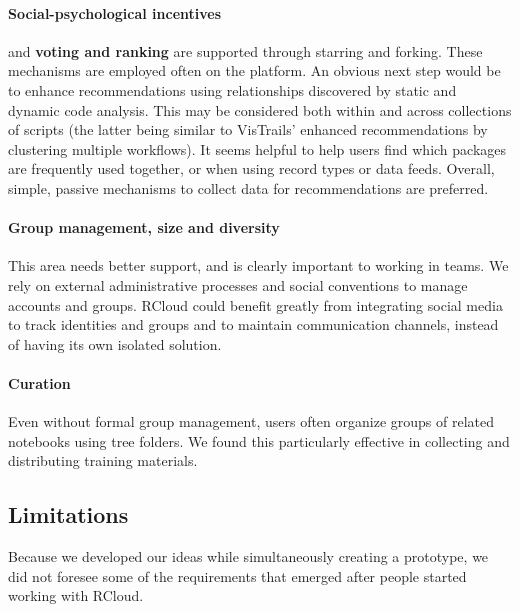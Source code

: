 \paragraph*{Social-psychological incentives} and {\bf voting and ranking} are
supported through starring and forking. These mechanisms are employed often
on the platform. An obvious next step would be to enhance recommendations
using relationships discovered by static and dynamic code analysis. This
may be considered both within and across collections of scripts (the latter
being similar to VisTrails' enhanced recommendations by clustering multiple
workflows). It seems helpful to help users find which packages are frequently
used together, or when using record types or data feeds.
Overall, simple, passive mechanisms to collect data for recommendations are preferred.

\paragraph*{Group management, size and diversity} This area needs better
support, and is clearly important to working in teams.
We rely on external administrative processes and social conventions
to manage accounts and groups. RCloud could benefit greatly from
integrating social media to track identities and groups and to maintain
communication channels, instead of having its own isolated solution.

\paragraph*{Curation} Even without formal group management, users often
organize groups of related notebooks using tree folders.
We found this particularly effective in collecting and distributing
training materials.

\subsection{Limitations}
Because we developed our ideas while simultaneously creating a prototype,
we did not foresee some of the requirements that emerged after
people started working with RCloud.


